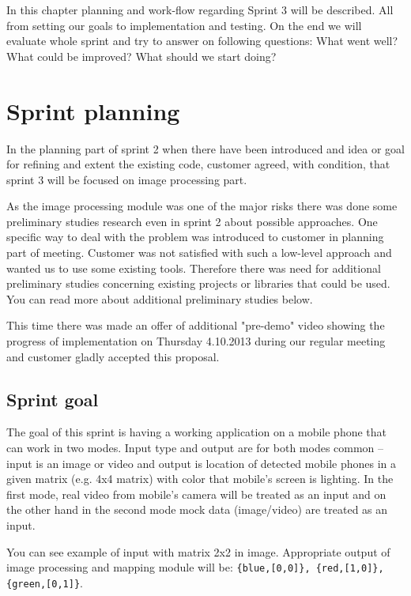 In this chapter planning and work-flow regarding Sprint 3 will be described. 
All from setting our goals to implementation and testing. On the end we will evaluate whole sprint and try to answer on following questions: What went well? What could be improved? What should we start doing?  

\section{Sprint planning}
In the planning part of sprint 2 when there have been introduced and idea or goal for refining and extent the existing code, customer agreed, with condition, that sprint 3 will be focused on image processing part.

As the image processing module was one of the major risks there was done some preliminary studies research even in sprint 2 about possible approaches.
One specific way to deal with the problem was introduced to customer in planning part of meeting.
Customer was not satisfied with such a low-level approach and wanted us to use some existing tools.
Therefore there was need for additional preliminary studies concerning existing projects or libraries that could be used.
You can read more about additional preliminary studies below.

This time there was made an offer of additional "pre-demo" video showing the progress of implementation on Thursday 4.10.2013 during our regular meeting and customer gladly accepted this proposal.

\subsection{Sprint goal}
The goal of this sprint is having a working application on a mobile phone that can work in two modes.  
Input type and output are for both modes common -- input is an image or video and output is location of detected mobile phones in a given matrix (e.g. 4x4 matrix) with color that mobile's screen is lighting.
In the first mode, real video from mobile's camera will be treated as an input and on the other hand in the second mode mock data (image/video) are treated as an input.

You can see example of input with matrix 2x2 in image. Appropriate output of image processing and mapping module will be: \texttt{\{blue,[0,0]\}, \{red,[1,0]\}, \{green,[0,1]\}}.

